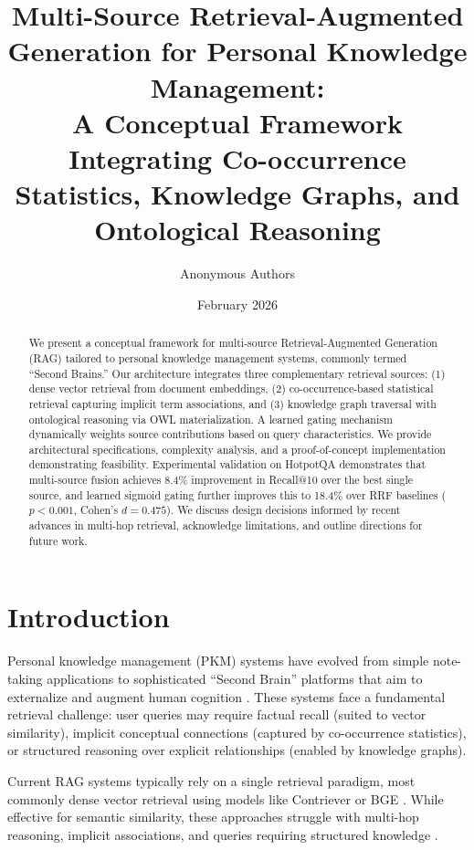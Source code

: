 \documentclass[11pt,a4paper]{article}
\title{Multi-Source Retrieval-Augmented Generation for Personal Knowledge Management: \\
A Conceptual Framework Integrating Co-occurrence Statistics, Knowledge Graphs, and Ontological Reasoning}
\author{Anonymous Authors}
\date{February 2026}
\begin{document}
\maketitle

\begin{abstract}
We present a conceptual framework for multi-source Retrieval-Augmented Generation (RAG) tailored to personal knowledge management systems, commonly termed ``Second Brains.'' Our architecture integrates three complementary retrieval sources: (1) dense vector retrieval from document embeddings, (2) co-occurrence-based statistical retrieval capturing implicit term associations, and (3) knowledge graph traversal with ontological reasoning via OWL materialization. A learned gating mechanism dynamically weights source contributions based on query characteristics. We provide architectural specifications, complexity analysis, and a proof-of-concept implementation demonstrating feasibility. Experimental validation on HotpotQA demonstrates that multi-source fusion achieves 8.4\% improvement in Recall@10 over the best single source, and learned sigmoid gating further improves this to 18.4\% over RRF baselines ($p<0.001$, Cohen's $d=0.475$). We discuss design decisions informed by recent advances in multi-hop retrieval, acknowledge limitations, and outline directions for future work.
\end{abstract}

\section{Introduction}
\label{sec:introduction}

Personal knowledge management (PKM) systems have evolved from simple note-taking applications to sophisticated ``Second Brain'' platforms that aim to externalize and augment human cognition \citep{forte2022building}. These systems face a fundamental retrieval challenge: user queries may require factual recall (suited to vector similarity), implicit conceptual connections (captured by co-occurrence statistics), or structured reasoning over explicit relationships (enabled by knowledge graphs).

Current RAG systems typically rely on a single retrieval paradigm, most commonly dense vector retrieval using models like Contriever \citep{izacard2022unsupervised} or BGE \citep{xiao2023bge}. While effective for semantic similarity, these approaches struggle with multi-hop reasoning, implicit associations, and queries requiring structured knowledge \citep{xiong2021answering}.
\end{document}
